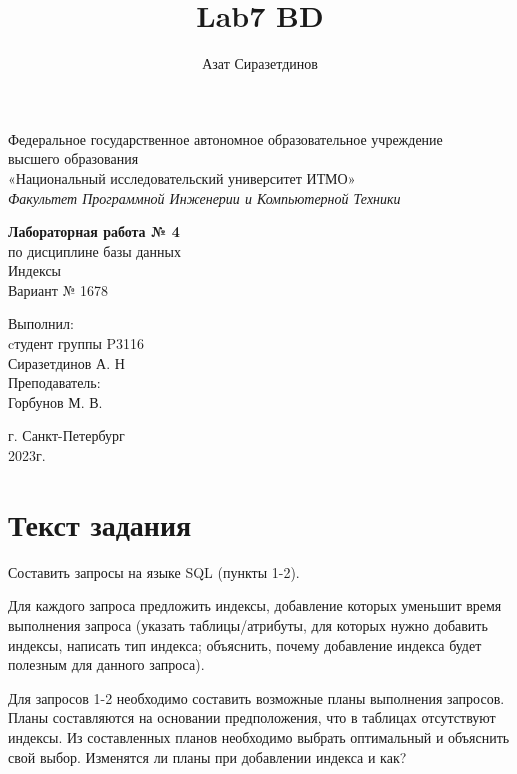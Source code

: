 \documentclass[12pt]{article}
\title{Lab7 BD}
\author{Азат Сиразетдинов}
\begin{document}
	{\thispagestyle{empty}
		
	\begin{center}
		Федеральное государственное автономное образовательное учреждение\\ 
		высшего образования\\
		«Национальный исследовательский университет ИТМО»\\
		\textit{Факультет Программной Инженерии и Компьютерной Техники}\\
	\end{center}
	\vspace{2cm}
	\begin{center}
		\large
		\textbf{Лабораторная работа № 4}\\
		по дисциплине базы данных\\
		Индексы\\
		Вариант № 1678
	\end{center}
	\vspace{7cm}
	\begin{flushright}
		Выполнил:\\
		cтудент  группы P3116\\
		Сиразетдинов А. Н\\
		Преподаватель: \\
		Горбунов М. В.\\
	\end{flushright}
	\vspace{6cm}
	\begin{center}
		г. Санкт-Петербург\\
		2023г.
	\end{center}
	\newpage
	}
	\tableofcontents
	\newpage
	
	\section{Текст задания}
	Составить запросы на языке SQL (пункты 1-2).
	
	Для каждого запроса предложить индексы, добавление которых уменьшит время выполнения запроса (указать таблицы/атрибуты, для которых нужно добавить индексы, написать тип индекса; объяснить, почему добавление индекса будет полезным для данного запроса).
	
	Для запросов 1-2 необходимо составить возможные планы выполнения запросов. Планы составляются на основании предположения, что в таблицах отсутствуют индексы. Из составленных планов необходимо выбрать оптимальный и объяснить свой выбор.
	Изменятся ли планы при добавлении индекса и как?
	
\end{document}
